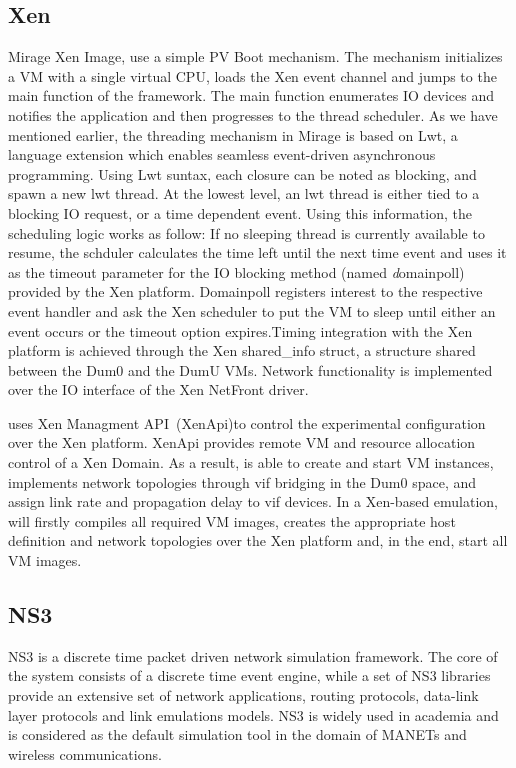 \subsection{Xen}

Mirage Xen Image, use a simple PV Boot
mechanism. The mechanism initializes a VM with a single virtual CPU, loads the
Xen event channel and jumps to the main function of the framework. The main function
enumerates IO devices and notifies the application and then progresses to the 
thread scheduler. As we have mentioned earlier, the threading
mechanism in Mirage is based on Lwt, a language extension which enables seamless
event-driven asynchronous programming. Using Lwt suntax, each closure can be
noted as blocking, and spawn a new lwt thread. At the lowest level, an lwt
thread is either tied to a blocking IO request, or a time dependent event. Using
this information, the scheduling logic works as follow: If no sleeping thread
is currently available to resume, the schduler calculates the
time left until the next time event and uses it as the timeout parameter for the
IO blocking method (named {\emph domainpoll}) provided by the Xen platform.
Domainpoll registers interest to the respective event handler and ask the Xen
scheduler to put the VM to sleep until either an event occurs or the timeout
option expires.Timing integration with the Xen platform is achieved through the Xen
shared\_info struct, a structure shared between the Dum0 and the DumU VMs. 
Network functionality is implemented over the IO interface of
the Xen NetFront driver.

\sdnsim uses Xen Managment API~(XenApi)to control the experimental
configuration over the Xen platform.
XenApi provides remote VM and resource allocation control of a Xen Domain. As a
result, \sdnsim is able to create and start VM instances, implements network
topologies through vif bridging in the Dum0 space, and assign link rate and
propagation delay to vif devices.  In a Xen-based emulation, \sdnsim  will
firstly compiles all required VM images, creates the appropriate host definition
and network topologies over the Xen platform and, in the end, start all VM images.

\subsection{NS3}

NS3 is a discrete time packet driven network simulation framework. The core of
the system consists of a discrete time event engine, while a set of NS3
libraries provide an extensive set of network applications, routing protocols,
data-link layer protocols and link emulations models. NS3 is widely used in
academia and is considered as the default simulation tool in the domain of
MANETs and wireless communications. 

